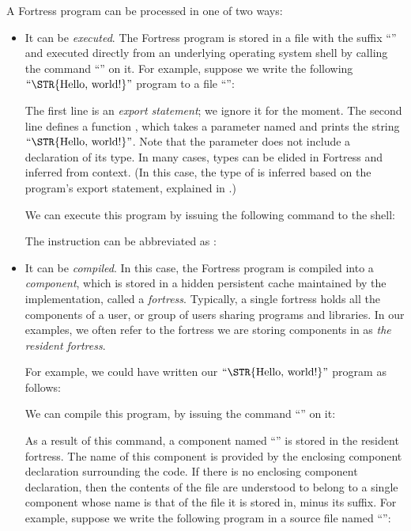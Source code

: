 A Fortress program can be processed in one of two ways:

\begin{itemize}

\item It can be \emph{executed}. The Fortress program is stored in a file with
the suffix ``'' and executed directly from an underlying
operating
system shell by calling the command ``'' on it.
For example,
suppose we write the following \(\hbox{\rm``\STR{Hello,~world!}''}\) program
to a file ``'':


The first line is an \emph{export statement};
we ignore it for the moment.
The second line defines a function ,
which takes a parameter named 
and prints the string \(\hbox{\rm``\STR{Hello,~world!}''}\).
Note that the parameter 
does not include a declaration of its type.
In many cases,
 types can be elided in Fortress and inferred from context.
(In this case,
the type of  is inferred based on the program's export statement,
explained in .)

We can execute this program by issuing the following command to the shell:


The instruction  can be abbreviated as :


\item It can be \emph{compiled}. In this case, the Fortress program is
compiled into a
\emph{component}, which is stored in a hidden persistent cache maintained by the implementation,
called a \emph{fortress}. Typically, a single fortress holds all the components
of a user, or group of users sharing programs and libraries.
In our examples,
we often refer to the fortress we are storing components in
as \emph{the resident fortress}.

For example, we could have written our \(\hbox{\rm``\STR{Hello,~world!}''}\)
program as follows:


We can compile this program, by issuing the command
``'' on it:


As a result of this command, a component named ``'' is stored
in the resident fortress. The name of this component is provided by
the enclosing component declaration surrounding the code. If there is
no enclosing component declaration, then the contents of the file are
understood to belong to a single component whose name is that of the
file it is stored in, minus its suffix. For example, suppose we write the
following program in a source file named ``'':



\end{itemize}
